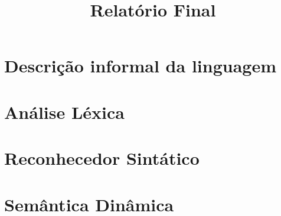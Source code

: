 \documentclass[12pt,oneside,a4paper,english]{abntex2}
\title{Relatório Final}
\begin{document}
\frenchspacing %

\imprimirfolhaderosto

\clearpage

\textual

\chapter{Descrição informal da linguagem}
  \label{chap:linguagem}
    

\chapter{Análise Léxica}
  \label{chap:lexico}
    

\chapter{Reconhecedor Sintático}
  \label{chap:sintatico}
  

\chapter{Semântica Dinâmica}
  \label{chap:semantico}
    
    
\end{document}
